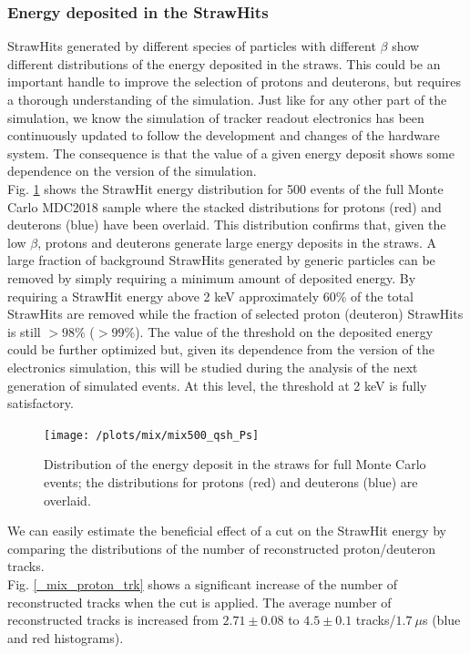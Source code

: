 \documentclass[12pt,a4paper,openright, oneside, titlepage]{book} %
\begin{document}
\subsubsection{Energy deposited in the StrawHits}
StrawHits generated by different species of particles with different $\beta$ show different distributions of the energy deposited in the straws. 
This could be an important handle to improve the selection of protons and deuterons, but requires a thorough understanding of the simulation. 
Just like for any other part of the simulation, we know the simulation of tracker readout electronics has been continuously updated to follow the development and changes of the hardware system.    
The consequence is that the value of a given energy deposit  shows some dependence on the version of the simulation.\\
Fig. \ref{_mix_proton_qsh} shows the StrawHit energy
distribution for 500 events of the full Monte Carlo MDC2018 sample where the stacked distributions for protons (red) and deuterons (blue) have been overlaid.
This distribution confirms that, given the low $\beta$, protons and deuterons generate large energy deposits in the straws. 
A large fraction of background StrawHits generated by generic particles can be removed by simply requiring a minimum amount of deposited energy.
By requiring a StrawHit energy above 2 keV approximately $60 \%$ of the total StrawHits are removed 
while the fraction of selected proton (deuteron) StrawHits is still  $> 98\%$  ($> 99\%$). 
The value of the threshold on the deposited energy could be further optimized but, given its dependence from the version of the electronics simulation, this will be studied during the analysis of the next generation of simulated events.
At this level, the threshold at 2 keV is fully satisfactory.

\begin{figure}[!htb]
\centering
\texttt{[image: /plots/mix/mix500\_qsh\_Ps]}
\caption[Distribution of the energy deposited in the tracker straws]
{Distribution of the energy deposit in the straws for full Monte Carlo events; 
the distributions for protons (red) and deuterons (blue) are overlaid.}
\label{_mix_proton_qsh}
\end{figure}

\noindent We can easily estimate the beneficial effect of a cut on the StrawHit energy by comparing the distributions of the number of reconstructed proton/deuteron tracks.\\ 
Fig. \ref{_mix_proton_trk} shows a significant increase of the number of reconstructed tracks when the cut is applied. 
The average number of reconstructed tracks is increased from $2.71 \pm 0.08$ to $4.5\pm0.1$ tracks/$1.7\ \mu$s (blue and red histograms).
\end{document}
